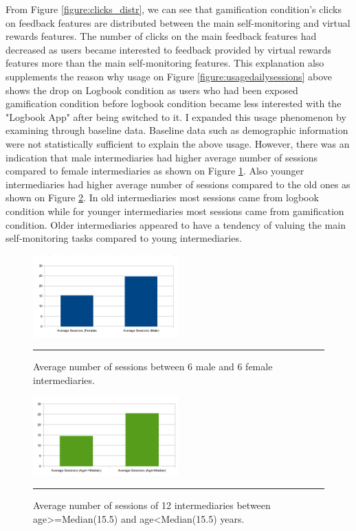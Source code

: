 From Figure \ref{figure:clicks_distr}, we can see that gamification condition's clicks on feedback features are distributed between the main self-monitoring and virtual rewards features. The number of clicks on the main feedback features had decreased as users became interested to feedback provided by virtual rewards features more than the main self-monitoring features. This explanation also supplements the reason why usage on Figure \ref{figure:usagedailysessions} above shows the drop on Logbook condition as users who had been exposed gamification condition before logbook condition became less interested with the "Logbook App" after being switched to it. I expanded this usage phenomenon by examining through baseline data.\newline
Baseline data such as demographic information were not statistically sufficient to explain the above usage. However, there was an indication that male intermediaries had higher average number of sessions compared to female intermediaries as shown on Figure \ref{figure:usagegender}.  Also younger intermediaries had higher average number of sessions compared to the old ones as shown on Figure \ref{figure:usageage}. In old intermediaries most sessions came from logbook condition while for younger intermediaries most sessions came from gamification condition. Older intermediaries appeared to have a tendency of valuing the main self-monitoring tasks compared to young intermediaries.   \newline\newline
\begin{figure}[htbp]
  \centering
    \includegraphics[width=0.5\textwidth]{Figures/session_gender.png}
    \rule{35em}{0.5pt}
  \caption{Average number of sessions between 6 male and 6 female intermediaries.}
  \label{figure:usagegender}
\end{figure}
\begin{figure}[htbp]
  \centering
    \includegraphics[width=0.5\textwidth]{Figures/session_age.png}
    \rule{35em}{0.5pt}
  \caption{Average number of sessions of 12 intermediaries between age\textgreater=Median(15.5) and age\textless Median(15.5) years.}
  \label{figure:usageage}
\end{figure}
